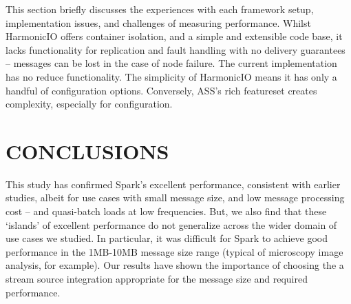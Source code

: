 \documentclass[conference]{IEEEtran}
\begin{document}
This section briefly discusses the experiences with each framework setup, 
implementation issues, and challenges of measuring performance. Whilst HarmonicIO offers container isolation, and a simple and extensible code base, it lacks functionality for replication and fault handling with no delivery guarantees -- messages can be lost in the case of node failure. The current implementation has no reduce functionality. The simplicity of HarmonicIO means it has only a handful of configuration options.
Conversely, ASS's rich featureset creates complexity, especially for configuration. 

\section{CONCLUSIONS}\label{conc}
This study has confirmed Spark's excellent performance, consistent with earlier studies, albeit for use cases with small message size, and low message processing cost -- and quasi-batch loads at low frequencies. But, we also find that these `islands' of excellent performance do not generalize across the wider domain of use cases we studied. In particular, it was difficult for Spark to achieve good performance in the 1MB-10MB message size range (typical of microscopy image analysis, for example). %
Our results have shown the importance of choosing the a stream source integration appropriate for the message size and required performance.
\end{document}
